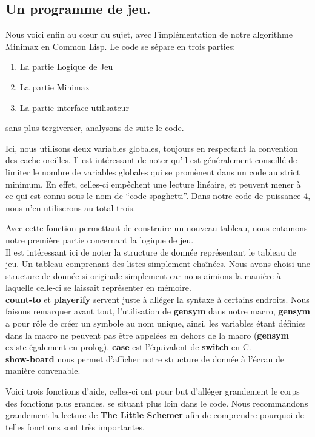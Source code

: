 \documentclass[a4paper, 12pt]{article}
\newcommand{\connect}[1]{
  
}
\numberwithin{equation}{subsection}
\begin{document}
\subsection{Un programme de jeu.}
Nous voici enfin au cœur du sujet, avec l'implémentation de notre algorithme Minimax en Common Lisp. Le code se sépare en trois parties:
\begin{enumerate}
  \item La partie Logique de Jeu
  \item La partie Minimax
  \item La partie interface utilisateur
\end{enumerate}
sans plus tergiverser, analysons de suite le code.
\connect{1-7}
Ici, nous utilisons deux variables globales, toujours en respectant la convention des cache-oreilles. Il est intéressant de noter qu'il est généralement conseillé de limiter le nombre de variables globales qui se promènent dans un code au strict minimum. En effet, celles-ci empêchent une lecture linéaire, et peuvent mener à ce qui est connu sous le nom de ``code spaghetti''. Dans notre code de puissance 4, nous n'en utiliserons au total trois.
\connect{9-14}
Avec cette fonction permettant de construire un nouveau tableau, nous entamons notre première partie concernant la logique de jeu. \\

Il est intéressant ici de noter la structure de donnée représentant le tableau de jeu. Un tableau comprenant des listes simplement chaînées. Nous avons choisi une structure de donnée si originale simplement car nous aimions la manière à laquelle celle-ci se laissait représenter en mémoire. \\
\connect{16-39}
{\bf count-to} et {\bf playerify} servent juste à alléger la syntaxe à certains endroits.
Nous faisons remarquer avant tout, l'utilisation de {\bf gensym} dans notre macro, {\bf gensym} a pour rôle de créer un symbole au nom unique, ainsi, les variables étant définies dans la macro ne peuvent pas être appelées en dehors de la macro ({\bf gensym} existe également en prolog). {\bf case} est l'équivalent de {\bf switch} en C. \\

{\bf show-board} nous permet d'afficher notre structure de donnée à l'écran de manière convenable.
\connect{41-53}
Voici trois fonctions d'aide, celles-ci ont pour but d'alléger grandement le corps des fonctions plus grandes, se situant plus loin dans le code. Nous recommandons grandement la lecture de {\bf The Little Schemer} afin de comprendre pourquoi de telles fonctions sont très importantes.
\end{document}

